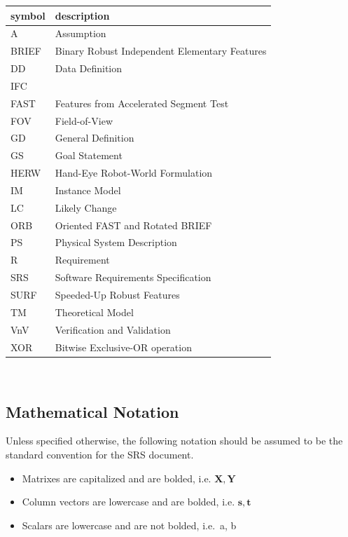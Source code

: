 \documentclass[12pt]{article}
\begin{document}
\renewcommand{\arraystretch}{1.2}
\begin{tabular}{l l} 
  \toprule		
  \textbf{symbol} & \textbf{description}\\
  \midrule 
  A & Assumption\\
  BRIEF & Binary Robust Independent Elementary Features\\ 
  DD & Data Definition\\
  IFC & \progname{}\\
  FAST & Features from Accelerated Segment Test\\
  FOV & Field-of-View\\
  GD & General Definition\\
  GS & Goal Statement\\
  HERW  & Hand-Eye Robot-World Formulation \\
  IM & Instance Model\\
  LC & Likely Change\\
  ORB & Oriented FAST and Rotated BRIEF\\
  PS & Physical System Description\\
  R & Requirement\\
  SRS & Software Requirements Specification\\
  SURF & Speeded-Up Robust Features\\
  TM & Theoretical Model\\
  VnV & Verification and Validation\\
  XOR & Bitwise Exclusive-OR operation\\
  \bottomrule
\end{tabular}\\

\subsection{Mathematical Notation}
Unless specified otherwise, the following notation should be assumed to be the standard 
convention for the SRS document.
\begin{itemize}
  \item Matrixes are capitalized and are bolded, i.e. $\mathbf{X, Y}$
  \item Column vectors are lowercase and are bolded, i.e. $\mathbf{s, t}$
  \item Scalars are lowercase and are not bolded, i.e.\ a, b
\end{itemize}

\newpage

\end{document}
